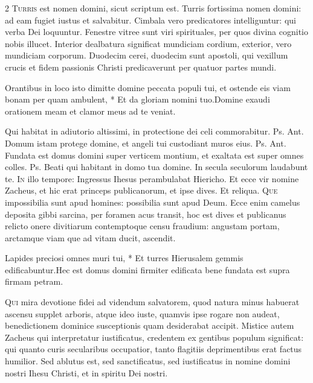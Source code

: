 \begin{multicols*}{2}
\lettrine[lines=2]{\zallmancaps \color{Red} T}{urris} est nomen domini, sicut scriptum est. Turris fortissima nomen domini: ad eam fugiet iustus et salvabitur. Cimbala vero predicatores intelliguntur: qui verba Dei loquuntur. Fenestre vitree sunt viri spirituales, per quos divina cognitio nobis illucet. Interior dealbatura significat mundiciam cordium, exterior, vero mundiciam corporum. Duodecim cerei, duodecim sunt apostoli, qui vexillum crucis et fidem passionis Christi predicaverunt per quatuor partes mundi.
\begin{responsory-doxology}
{Orantibus in loco isto dimitte domine peccata populi tui, et ostende eis viam bonam per quam ambulent, * Et da gloriam nomini tuo.}{Domine exaudi orationem meam et clamor meus ad te veniat.}
\end{responsory-doxology}%
 Qui habitat in adiutorio altissimi, in protectione dei celi commorabitur. {\color{Red} Ps.}  {\color{Red} Ant.} Domum istam protege domine, et angeli tui custodiant muros eius. {\color{Red} Ps.}  {\color{Red} Ant.} Fundata est domus domini super verticem montium, et exaltata est super omnes colles. {\color{Red} Ps.}  \V Beati qui habitant in domo tua domine. \R In secula seculorum laudabunt te.
\lettrine[lines=2]{\zallmancaps \color{Blue} I}{n} illo tempore: Ingressus Ihesus perambulabat Hiericho. Et ecce vir nomine Zacheus, et hic erat princeps publicanorum, et ipse dives. Et reliqua.
\lettrine[lines=2]{\zallmancaps \color{Red} Q}{ue} impossibilia sunt apud homines: possibilia sunt apud Deum. Ecce enim camelus deposita gibbi sarcina, per foramen acus transit, hoc est dives et publicanus relicto onere divitiarum contemptoque censu fraudium: angustam portam, arctamque viam que ad vitam ducit, ascendit.
\begin{responsory}
{Lapides preciosi omnes muri tui, * Et turres Hierusalem gemmis edificabuntur.}{Hec est domus domini firmiter edificata bene fundata est supra firmam petram.}
\end{responsory}%
\lettrine[lines=2]{\zallmancaps \color{Blue} Q}{ui} mira devotione fidei ad videndum salvatorem, quod natura minus habuerat ascensu supplet arboris, atque ideo iuste, quamvis ipse rogare non audeat, benedictionem dominice susceptionis quam desiderabat accipit. Mistice autem Zacheus qui interpretatur iustificatus, credentem ex gentibus populum significat: qui quanto curis secularibus occupatior, tanto flagitiis deprimentibus erat factus humilior. Sed ablutus est, sed sanctificatus, sed iustificatus in nomine domini nostri Ihesu Christi, et in spiritu Dei nostri.

\end{multicols*}

